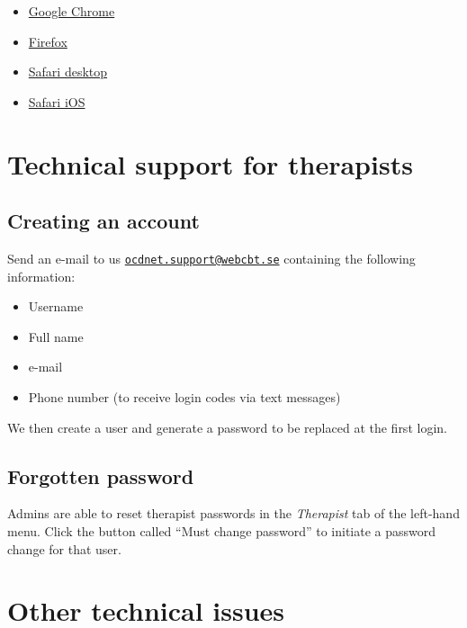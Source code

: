 \documentclass[]{book}
\providecommand{\tightlist}{%
  \setlength{\itemsep}{0pt}\setlength{\parskip}{0pt}}
\theoremstyle{definition}
\theoremstyle{definition}
\theoremstyle{definition}
\theoremstyle{remark}
\begin{document}
\begin{itemize}
\tightlist
\item
  \href{https://support.google.com/chrome/answer/95647?co=GENIE.Platform\%3DDesktop\&hl=en}{Google
  Chrome}
\item
  \href{https://support.mozilla.org/en-US/kb/delete-cookies-remove-info-websites-stored}{Firefox}
\item
  \href{https://support.apple.com/kb/ph21411?locale=en_US}{Safari
  desktop}
\item
  \href{https://support.apple.com/en-gb/HT201265}{Safari iOS}
\end{itemize}

\hypertarget{technical-support-for-therapists}{%
\section{Technical support for
therapists}\label{technical-support-for-therapists}}

\hypertarget{creating-an-account}{%
\subsection{Creating an account}\label{creating-an-account}}

Send an e-mail to us
\href{mailto:ocdnet.support@webcbt.se}{\nolinkurl{ocdnet.support@webcbt.se}}
containing the following information:

\begin{itemize}
\tightlist
\item
  Username
\item
  Full name
\item
  e-mail
\item
  Phone number (to receive login codes via text messages)
\end{itemize}

We then create a user and generate a password to be replaced at the
first login.

\hypertarget{forgotten-password}{%
\subsection{Forgotten password}\label{forgotten-password}}

Admins are able to reset therapist passwords in the \emph{Therapist} tab
of the left-hand menu. Click the button called ``Must change password''
to initiate a password change for that user.

\hypertarget{other-technical-issues}{%
\section{Other technical issues}\label{other-technical-issues}}
\end{document}
